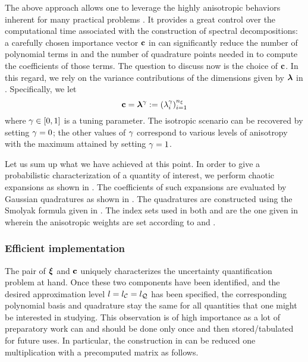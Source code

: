 The above approach allows one to leverage the highly anisotropic behaviors inherent for many practical problems \cite{nobile2008}.
It provides a great control over the computational time associated with the construction of spectral decompositions: a carefully chosen importance vector $\mathbf{c}$ in  can significantly reduce the number of polynomial terms in  and the number of quadrature points needed in  to compute the coefficients of those terms.
The question to discuss now is the choice of $\mathbf{c}$.
In this regard, we rely on the variance contributions of the dimensions given by  $\bm{\lambda}$ in .
Specifically, we let
\begin{equation} \elab{dimension-anisotropy}
  \dimensionAnisotropy = \dimensionContribution^\anisotropyKnob := (\lambda_i^\anisotropyKnob)_{i = 1}^\nvars
\end{equation}
where $\gamma \in [0, 1]$ is a tuning parameter.
The isotropic scenario can be recovered by setting $\gamma = 0$; the other values of $\gamma$ correspond to various levels of anisotropy with the maximum attained by setting $\gamma = 1$.

Let us sum up what we have achieved at this point.
In order to give a probabilistic characterization of a quantity of interest, we perform chaotic expansions as shown in .
The coefficients of such expansions are evaluated by Gaussian quadratures as shown in .
The quadratures are constructed using the Smolyak formula given in .
The index sets used in both  and  are the one given in  wherein the anisotropic weights are set according to  and .

\subsubsection{Efficient implementation}
The pair of $\bm{\xi}$ and $\mathbf{c}$ uniquely characterizes the uncertainty quantification problem at hand.
Once these two components have been identified, and the desired approximation level $l = {l_\mathcal{C}} = {l_\mathcal{Q}}$ has been specified, the corresponding polynomial basis and quadrature stay the same for all quantities that one might be interested in studying.
This observation is of high importance as a lot of preparatory work can and should be done only once and then stored/tabulated for future uses.
In particular, the construction in  can be reduced one multiplication with a precomputed matrix as follows.

